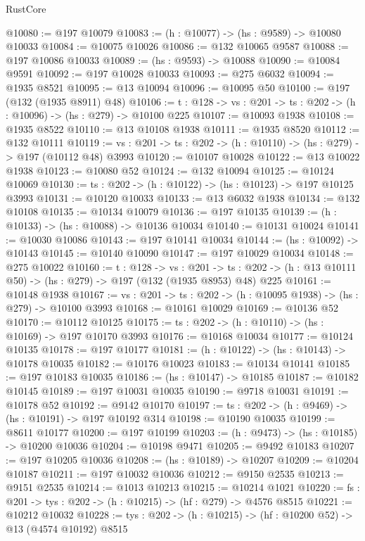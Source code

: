 \begin{lexlean}{RustCore}
\begin{coremodule}
@10080 := @197 @10079
@10083 := (h : @10077) -> (hs : @9589) -> @10080 @10033
@10084 := @10075 @10026
@10086 := @132 @10065 @9587
@10088 := @197 @10086 @10033
@10089 := (hs : @9593) -> @10088
@10090 := @10084 @9591
@10092 := @197 @10028 @10033
@10093 := @275 @6032
@10094 := @1935 @8521
@10095 := @13 @10094
@10096 := @10095 @50
@10100 := @197 (@132 (@1935 @8911) @48)
@10106 := {t : @128} -> {vs : @201} -> {ts : @202} -> (h : @10096) -> (hs : @279) -> @10100 @225
@10107 := @10093 @1938
@10108 := @1935 @8522
@10110 := @13 @10108 @1938
@10111 := @1935 @8520
@10112 := @132 @10111
@10119 := {vs : @201} -> {ts : @202} -> (h : @10110) -> (hs : @279) -> @197 (@10112 @48) @3993
@10120 := @10107 @10028
@10122 := @13 @10022 @1938
@10123 := @10080 @52
@10124 := @132 @10094
@10125 := @10124 @10069
@10130 := {ts : @202} -> (h : @10122) -> (hs : @10123) -> @197 @10125 @3993
@10131 := @10120 @10033
@10133 := @13 @6032 @1938
@10134 := @132 @10108
@10135 := @10134 @10079
@10136 := @197 @10135
@10139 := (h : @10133) -> (hs : @10088) -> @10136 @10034
@10140 := @10131 @10024
@10141 := @10030 @10086
@10143 := @197 @10141 @10034
@10144 := (hs : @10092) -> @10143
@10145 := @10140 @10090
@10147 := @197 @10029 @10034
@10148 := @275 @10022
@10160 := {t : @128} ->
  {vs : @201} ->
  {ts : @202} -> (h : @13 @10111 @50) -> (hs : @279) -> @197 (@132 (@1935 @8953) @48) @225
@10161 := @10148 @1938
@10167 := {vs : @201} -> {ts : @202} -> (h : @10095 @1938) -> (hs : @279) -> @10100 @3993
@10168 := @10161 @10029
@10169 := @10136 @52
@10170 := @10112 @10125
@10175 := {ts : @202} -> (h : @10110) -> (hs : @10169) -> @197 @10170 @3993
@10176 := @10168 @10034
@10177 := @10124 @10135
@10178 := @197 @10177
@10181 := (h : @10122) -> (hs : @10143) -> @10178 @10035
@10182 := @10176 @10023
@10183 := @10134 @10141
@10185 := @197 @10183 @10035
@10186 := (hs : @10147) -> @10185
@10187 := @10182 @10145
@10189 := @197 @10031 @10035
@10190 := @9718 @10031
@10191 := @10178 @52
@10192 := @9142 @10170
@10197 := {ts : @202} -> (h : @9469) -> (hs : @10191) -> @197 @10192 @314
@10198 := @10190 @10035
@10199 := @8611 @10177
@10200 := @197 @10199
@10203 := (h : @9473) -> (hs : @10185) -> @10200 @10036
@10204 := @10198 @9471
@10205 := @9492 @10183
@10207 := @197 @10205 @10036
@10208 := (hs : @10189) -> @10207
@10209 := @10204 @10187
@10211 := @197 @10032 @10036
@10212 := @9150 @2535
@10213 := @9151 @2535
@10214 := @1013 @10213
@10215 := @10214 @1021
@10220 := {fs : @201} -> {tys : @202} -> (h : @10215) -> (hf : @279) -> @4576 @8515
@10221 := @10212 @10032
@10228 := {tys : @202} -> (h : @10215) -> (hf : @10200 @52) -> @13 (@4574 @10192) @8515

\end{coremodule}
\end{lexlean}

